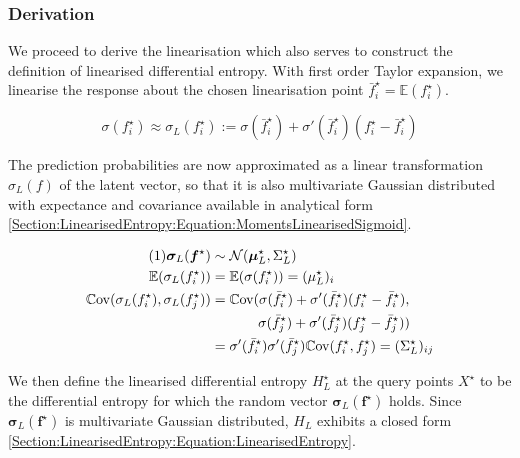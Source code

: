 \documentclass{article}
\renewcommand{\vec}[1]{\boldsymbol{#1}}
\newcommand\numberthis{\addtocounter{equation}{1}\tag{\theequation}}
\begin{document}
		\subsubsection{Derivation}
		
			We proceed to derive the linearisation which also serves to construct the definition of linearised differential entropy. With first order Taylor expansion, we linearise the response about the chosen linearisation point $\bar{f}^{\star}_{i} = \mathbb{E}(f^{\star}_{i})$.
			
			\begin{equation}
				\sigma(f^{\star}_{i}) \approx \sigma_{L}(f^{\star}_{i}) := \sigma(\bar{f}^{\star}_{i}) + \sigma'(\bar{f}^{\star}_{i}) (f^{\star}_{i} - \bar{f}^{\star}_{i})
			\label{Section:LinearisedEntropy:Equation:LinearisingSigmoid}
			\end{equation}
			
			The prediction probabilities are now approximated as a linear transformation $\sigma_{L}(f)$ of the latent vector, so that it is also multivariate Gaussian distributed with expectance and covariance available in analytical form \eqref{Section:LinearisedEntropy:Equation:MomentsLinearisedSigmoid}.
			
			\begin{align*}
			\numberthis \label{Section:LinearisedEntropy:Equation:MomentsLinearisedSigmoid}
					\vec{\sigma}_{L}(\vec{f}^{\star}) & \sim \mathcal{N}(\vec{\mu}^{\star}_{L}, \Sigma^{\star}_{L}) \\
					\mathbb{E}(\sigma_{L}(f^{\star}_{i})) & = \mathbb{E}(\sigma(f^{\star}_{i})) = ({\mu^{\star}_{L}})_{i} \\
					\mathbb{C}\mathrm{ov}(\sigma_{L}(f^{\star}_{i}), \sigma_{L}(f^{\star}_{j})) & =  \mathbb{C}\mathrm{ov}(\sigma(\bar{f}^{\star}_{i}) + \sigma'(\bar{f}^{\star}_{i}) (f^{\star}_{i} - \bar{f}^{\star}_{i}),\\ 
					& \qquad \;\;\;\;\; \sigma(\bar{f}^{\star}_{j}) + \sigma'(\bar{f}^{\star}_{j}) (f^{\star}_{j} - \bar{f}^{\star}_{j})) \\
					& = \sigma'(\bar{f}^{\star}_{i}) \sigma'(\bar{f}^{\star}_{j}) \mathbb{C}\mathrm{ov}(f^{\star}_{i}, f^{\star}_{j}) = ({\Sigma^{\star}_{L}})_{ij}			
			\end{align*}
			
			We then define the linearised differential entropy $H^{\star}_{L}$ at the query points $X^{\star}$ to be the differential entropy for which the random vector $\vec{\sigma}_{L}(\vec{f}^{\star})$ holds. Since $\vec{\sigma}_{L}(\vec{f}^{\star})$ is multivariate Gaussian distributed, $H_{L}$ exhibits a closed form \eqref{Section:LinearisedEntropy:Equation:LinearisedEntropy}.
			
\end{document}
